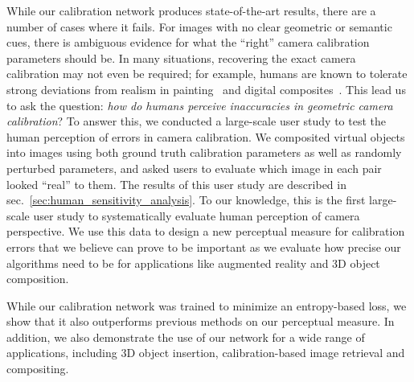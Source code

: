 While our calibration network produces state-of-the-art results, there are a number of cases where it fails. For images with no clear geometric or semantic cues, there is ambiguous evidence for what the ``right'' camera calibration parameters should be. In many situations, recovering the exact camera calibration may not even be required; for example, humans are known to tolerate strong deviations from realism in painting~\cite{Cavanagh2005} and digital composites~\cite{Farid2010}. This lead us to ask the question: \emph{how do humans perceive inaccuracies in geometric camera calibration}? To answer this, we conducted a large-scale user study to test the human perception of errors in camera calibration. We composited virtual objects into images using both ground truth calibration parameters as well as randomly perturbed parameters, and asked users to evaluate which image in each pair looked ``real'' to them. The results of this user study are described in sec.~\ref{sec:human_sensitivity_analysis}. To our knowledge, this is the first large-scale user study to systematically evaluate human perception of camera perspective. We use this data to design a new perceptual measure for calibration errors that we believe can prove to be important as we evaluate how precise our algorithms need to be for applications like augmented reality and 3D object composition.

While our calibration network was trained to minimize an entropy-based loss, we show that it also outperforms previous methods on our perceptual measure. In addition, we also demonstrate the use of our network for a wide range of applications, including 3D object insertion, calibration-based image retrieval and compositing.  

